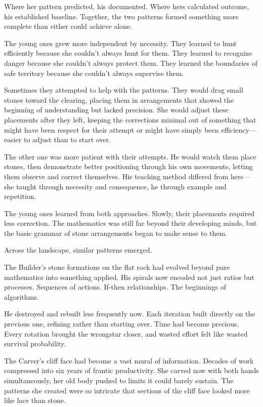 Where her pattern predicted, his documented. Where hers calculated outcome, his established baseline. Together, the two patterns formed something more complete than either could achieve alone.

The young ones grew more independent by necessity. They learned to hunt efficiently because she couldn't always hunt for them. They learned to recognize danger because she couldn't always protect them. They learned the boundaries of safe territory because she couldn't always supervise them.

Sometimes they attempted to help with the patterns. They would drag small stones toward the clearing, placing them in arrangements that showed the beginning of understanding but lacked precision. She would adjust these placements after they left, keeping the corrections minimal out of something that might have been respect for their attempt or might have simply been efficiency—easier to adjust than to start over.

The other one was more patient with their attempts. He would watch them place stones, then demonstrate better positioning through his own movements, letting them observe and correct themselves. His teaching method differed from hers—she taught through necessity and consequence, he through example and repetition.

The young ones learned from both approaches. Slowly, their placements required less correction. The mathematics was still far beyond their developing minds, but the basic grammar of stone arrangements began to make sense to them.

\scenebreak

Across the landscape, similar patterns emerged.

The Builder's stone formations on the flat rock had evolved beyond pure mathematics into something applied. His spirals now encoded not just ratios but processes. Sequences of actions. If-then relationships. The beginnings of algorithms.

He destroyed and rebuilt less frequently now. Each iteration built directly on the previous one, refining rather than starting over. Time had become precious. Every rotation brought the wrongstar closer, and wasted effort felt like wasted survival probability.

The Carver's cliff face had become a vast mural of information. Decades of work compressed into six years of frantic productivity. She carved now with both hands simultaneously, her old body pushed to limits it could barely sustain. The patterns she created were so intricate that sections of the cliff face looked more like lace than stone.

